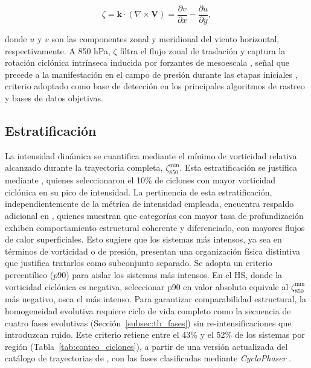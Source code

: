 \begin{equation}\label{eq:vorticidad_relativa}
\zeta = \mathbf{k} \cdot (\nabla \times \mathbf{V}) = \frac{\partial v}{\partial x} - \frac{\partial u}{\partial y},
\end{equation}

\noindent donde $u$ y $v$ son las componentes zonal y meridional del viento horizontal, respectivamente.
A 850 hPa, $\zeta$ filtra el flujo zonal de traslación y captura la rotación ciclónica intrínseca inducida por forzantes de mesoescala \citep{hoskins2005new}, señal que precede a la manifestación en el campo de presión durante las etapas iniciales \citep{sinclair1994objective}, criterio adoptado como base de detección en los principales algoritmos de rastreo y bases de datos objetivas.
  
\subsection{Estratificación}\label{subsec:tb_poblaciones}
La intensidad dinámica se cuantifica mediante el mínimo de vorticidad relativa alcanzado durante la trayectoria completa, $\zeta_{850}^{\min}$. 
Esta estratificación se justifica mediante \citet{priestley2022improved}, quienes seleccionaron el 10\% de ciclones con mayor vorticidad ciclónica en su pico de intensidad.
La pertinencia de esta estratificación, independientemente de la métrica de intensidad empleada, encuentra respaldo adicional en \citet{andrade2024composite}, quienes muestran que categorías con mayor tasa de profundización exhiben comportamiento estructural coherente y diferenciado, con mayores flujos de calor superficiales. 
Esto sugiere que los sistemas más intensos, ya sea en términos de vorticidad o de presión, presentan una organización física distintiva que justifica tratarlos como subconjunto separado.
Se adopta un criterio percentílico ($p90$) para aislar los sistemas más intensos. 
En el HS, donde la vorticidad ciclónica es negativa, seleccionar p90 en valor absoluto equivale al $\zeta_{850}^{\min}$ más negativo, osea el más intenso.
Para garantizar comparabilidad estructural, la homogeneidad evolutiva requiere ciclo de vida completo como la secuencia de cuatro fases evolutivas (Sección~\ref{subsec:tb_fases}) sin re-intensificaciones que introduzcan ruido. 
Este criterio retiene entre el 43\% y el 52\% de los sistemas por región (Tabla~\ref{tab:conteo_ciclones}), a partir de una versión actualizada del catálogo de trayectorias de \citet{gramcianinov2020analysis}, con las fases clasificadas mediante \textit{CycloPhaser} \citep{coutodesouza2024new, deSouza2025CycloPhaser}.
